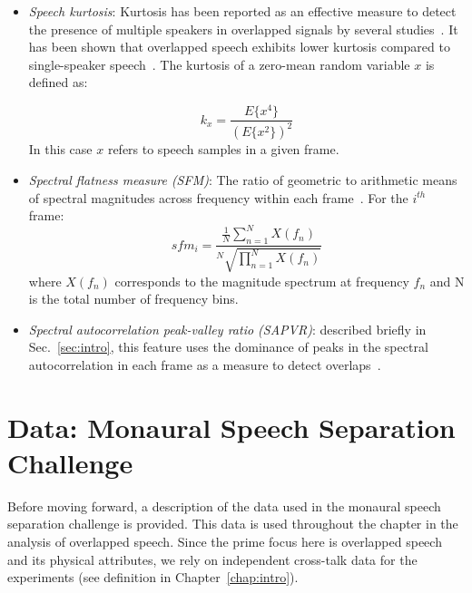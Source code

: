 \begin{itemize}
	\item {\it Speech kurtosis}: Kurtosis has been reported as an effective measure to detect the presence of multiple speakers in overlapped signals by several studies~\cite{Wrigley_05,boakye_thesis,temple_kurtosis}. 
	It has been shown that overlapped speech exhibits lower kurtosis compared to single-speaker speech~\cite{leblanc_deleon98}. The kurtosis of a zero-mean random variable $x$ is defined as:
	
	\begin{equation}
	\label{eq:kurtosis}
	k_x = \frac{E\{x^4\}}{(E\{x^2\})^2}
	\end{equation}
	\vspace{1mm}
	In this case $x$ refers to speech samples in a given frame. 
	\item {\it Spectral flatness measure (SFM)}: The ratio of geometric to arithmetic means of spectral magnitudes across frequency within each frame~\cite{nav_icassp13}. For the $i^{th}$ frame:
	\begin{equation}
	\label{eq:kurtosis}
	sfm_i = \frac{\frac{1}{N}\sum_{n=1}^{N}{X(f_n)}}{^N\sqrt{\prod_{n=1}^{N}{X(f_n)}}}
	\end{equation}
	\vspace{1mm}
	where $X(f_n)$ corresponds to the magnitude spectrum at frequency $f_n$ and {N} is the total number of frequency bins. 
	\item {\it Spectral autocorrelation peak-valley ratio (SAPVR)}: described briefly in Sec.~\ref{sec:intro}, this feature uses the dominance of peaks in the spectral autocorrelation in each frame as a measure to detect overlaps~\cite{sapvr_2000}. 
\end{itemize}

\newpage
\section{Data: Monaural Speech Separation Challenge}
\label{sec:data}
Before moving forward, a description of the data used in the monaural speech separation challenge is provided. 
This data is used throughout the chapter in the analysis of overlapped speech. 
Since the prime focus here is overlapped speech and its physical attributes, we rely on independent cross-talk data for the experiments (see definition in Chapter~\ref{chap:intro}). 

